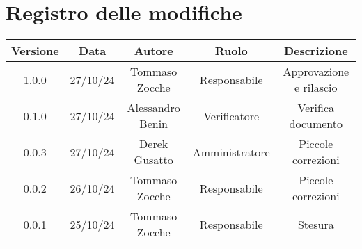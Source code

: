 
\section*{Registro delle modifiche}
\begin{table}[H]
    \begin{tabular}{|c|c|c|c|c|}
        \hline
         \textbf{Versione} &  \textbf{Data} &  \textbf{Autore} &  \textbf{Ruolo} & \textbf{Descrizione} \\
          \hline
          1.0.0 & 27/10/24 & Tommaso Zocche & Responsabile & Approvazione e rilascio\\
          \hline
           0.1.0 & 27/10/24 & Alessandro Benin & Verificatore &   Verifica documento\\
          \hline
          0.0.3 & 27/10/24 & Derek Gusatto & Amministratore & Piccole correzioni \\
          \hline
          0.0.2 & 26/10/24 & Tommaso Zocche & Responsabile & Piccole correzioni \\
          \hline
          0.0.1 & 25/10/24 & Tommaso Zocche & Responsabile & Stesura \\
          \hline
    \end{tabular}
\end{table}
